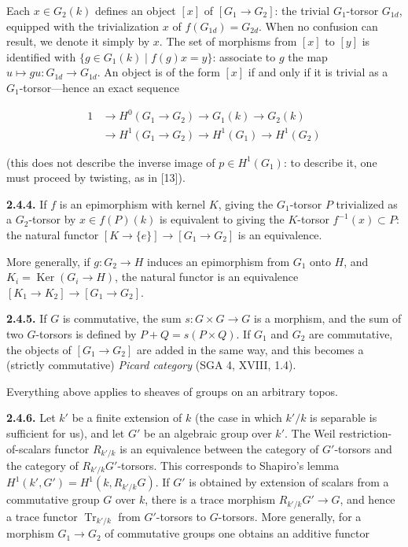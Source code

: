 \documentclass[10pt,a4paper]{article}
\newcommand{\SourcePage}[2]{\clearpage\setcounter{page}{#2}\typeout{D031_SOURCE_PAGE physical=#1 printed=#2}}
\begin{document}
Each \(x\in G_2(k)\) defines an object \([x]\) of \([G_1\to G_2]\): the trivial \(G_1\)-torsor \(G_{1d}\), equipped with the trivialization \(x\) of \(f(G_{1d})=G_{2d}\). When no confusion can result, we denote it simply by \(x\). The set of morphisms from \([x]\) to \([y]\) is identified with \(\{g\in G_1(k)\mid f(g)x=y\}\): associate to \(g\) the map \(u\mapsto gu:G_{1d}\to G_{1d}\). An object is of the form \([x]\) if and only if it is trivial as a \(G_1\)-torsor---hence an exact sequence

\[
\tag{2.4.3.1}
\begin{aligned}
1&\longrightarrow H^0(G_1\longrightarrow G_2)\longrightarrow G_1(k)\longrightarrow G_2(k)\\
 &\longrightarrow H^1(G_1\longrightarrow G_2)\longrightarrow H^1(G_1)\longrightarrow H^1(G_2)
\end{aligned}
\]

(this does not describe the inverse image of \(p\in H^1(G_1)\): to describe it, one must proceed by twisting, as in {[}13{]}).

\textbf{2.4.4.} If \(f\) is an epimorphism with kernel \(K\), giving the \(G_1\)-torsor \(P\) trivialized as a \(G_2\)-torsor by \(x\in f(P)(k)\) is equivalent to giving the \(K\)-torsor \(f^{-1}(x)\subset P\): the natural functor \([K\to\{e\}]\to[G_1\to G_2]\) is an equivalence.

More generally, if \(g:G_2\to H\) induces an epimorphism from \(G_1\) onto \(H\), and \(K_i=\operatorname{Ker}(G_i\to H)\), the natural functor is an equivalence \([K_1\to K_2]\to[G_1\to G_2]\).

\textbf{2.4.5.} If \(G\) is commutative, the sum \(s:G\times G\to G\) is a morphism, and the sum of two \(G\)-torsors is defined by \(P+Q=s(P\times Q)\). If \(G_1\) and \(G_2\) are commutative, the objects of \([G_1\to G_2]\) are added in the same way, and this becomes a (strictly commutative) \emph{Picard category} (SGA 4, XVIII, 1.4).

\SourcePage{30}{276}
Everything above applies to sheaves of groups on an arbitrary topos.

\textbf{2.4.6.} Let \(k'\) be a finite extension of \(k\) (the case in which \(k'/k\) is separable is sufficient for us), and let \(G'\) be an algebraic group over \(k'\). The Weil restriction-of-scalars functor \(R_{k'/k}\) is an equivalence between the category of \(G'\)-torsors and the category of \(R_{k'/k}G'\)-torsors. This corresponds to Shapiro's lemma \(H^1(k',G')=H^1(k,R_{k'/k}G)\). If \(G'\) is obtained by extension of scalars from a commutative group \(G\) over \(k\), there is a trace morphism \(R_{k'/k}G'\to G\), and hence a trace functor \(\operatorname{Tr}_{k'/k}\) from \(G'\)-torsors to \(G\)-torsors. More generally, for a morphism \(G_1\to G_2\) of commutative groups one obtains an additive functor
\end{document}
